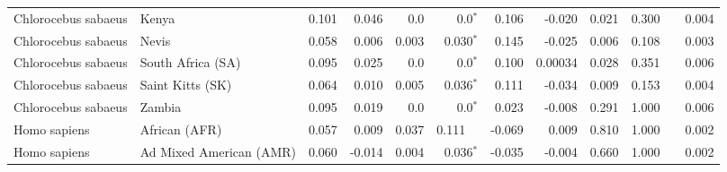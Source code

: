 \begin{center}
\begin{adjustbox}{width = 1\textwidth}
\begin{tabular}{|l|l|r|r|r|r|r|r|r|r|r|}
 Chlorocebus sabaeus &                           Kenya &                 0.101 &                                0.046 &                  0.0 &                             0.0$\bm{^*}$ &                 0.106 &                               -0.020 &                0.021 &                                  0.300~~ &              0.004 \\
 Chlorocebus sabaeus &                           Nevis &                 0.058 &                                0.006 &                0.003 &                           0.030$\bm{^*}$ &                 0.145 &                               -0.025 &                0.006 &                                  0.108~~ &              0.003 \\
 Chlorocebus sabaeus &               South Africa (SA) &                 0.095 &                                0.025 &                  0.0 &                             0.0$\bm{^*}$ &                 0.100 &                              0.00034 &                0.028 &                                  0.351~~ &              0.006 \\
 Chlorocebus sabaeus &                Saint Kitts (SK) &                 0.064 &                                0.010 &                0.005 &                           0.036$\bm{^*}$ &                 0.111 &                               -0.034 &                0.009 &                                  0.153~~ &              0.004 \\
 Chlorocebus sabaeus &                          Zambia &                 0.095 &                                0.019 &                  0.0 &                             0.0$\bm{^*}$ &                 0.023 &                               -0.008 &                0.291 &                                  1.000~~ &              0.006 \\
        Homo sapiens &                   African (AFR) &                 0.057 &                                0.009 &                0.037 &                                  0.111~~ &                -0.069 &                                0.009 &                0.810 &                                  1.000~~ &              0.002 \\
        Homo sapiens &         Ad Mixed American (AMR) &                 0.060 &                               -0.014 &                0.004 &                           0.036$\bm{^*}$ &                -0.035 &                               -0.004 &                0.660 &                                  1.000~~ &              0.002 \\

\end{tabular}
\end{adjustbox}
\end{center}
